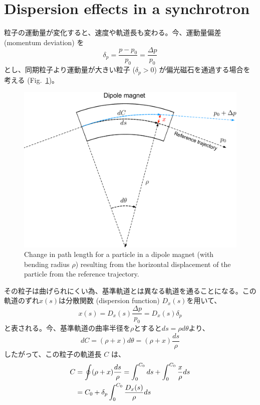 \documentclass[10pt,a4paper]{ltjsarticle}
\begin{document}
\section{Dispersion effects in a synchrotron}
粒子の運動量が変化すると、速度や軌道長も変わる。今、運動量偏差 (momentum deviation) を
%
\begin{equation}
  \delta_p = \frac{p-p_0}{p_0}=\frac{\Delta p}{p_0}
\end{equation}
%
とし、同期粒子より運動量が大きい粒子 ($\delta_p >0$) が偏光磁石を通過する場合を考える (Fig.~\ref{dispersion})。
%
\begin{figure}[hbt]
  \begin{center}
    \includegraphics[width=15cm,clip]{dispersion.pdf}
    \caption{Change in path length for a particle in a dipole magnet (with bending radius $\rho$) resulting from the horizontal
    displacement of the particle from the reference trajectory.}
    \label{dispersion}
  \end{center}
\end{figure}
%
その粒子は曲げられにくい為、基準軌道とは異なる軌道を通ることになる。この軌道のずれ$x(s)$は分散関数 (dispersion function) $D_x(s)$を用いて、
%
\begin{equation}
  x(s) = D_x(s)\frac{\Delta p}{p_0} = D_x(s)\delta_p 
\end{equation}
%
と表される。今、基準軌道の曲率半径を$\rho$とすると$ds = \rho d\theta$より、
%
\begin{equation}
  dC = (\rho + x) d\theta = (\rho + x) \frac{ds}{\rho}
\end{equation}
%
したがって、この粒子の軌道長 $C$ は、
%
\begin{align}
  C &= \oint (\rho + x)\frac{ds}{\rho} = \int_0^{C_0} ds + \int_0^{C_0}\frac{x}{\rho} ds \notag \\
  &= C_0 + \delta_p \int_0^{C_0}\frac{D_x(s)}{\rho} ds
\end{align}
\end{document}
